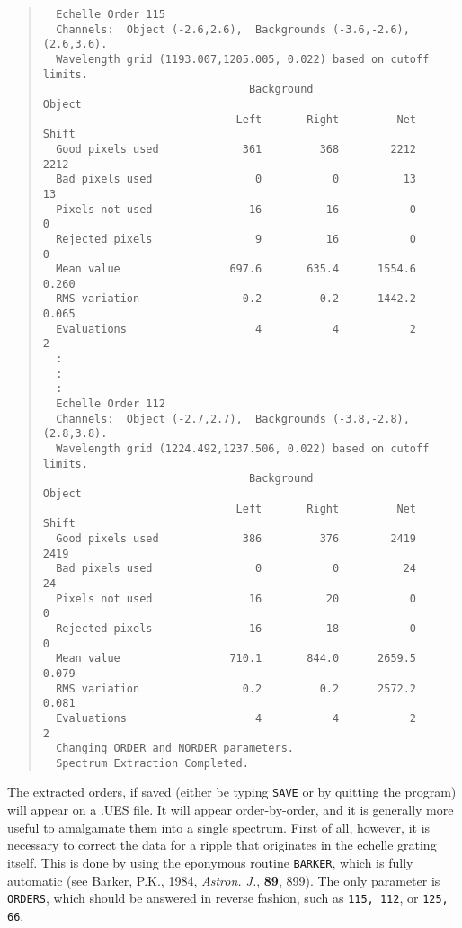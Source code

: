\begin{quote}
\begin{verbatim}
  Echelle Order 115
  Channels:  Object (-2.6,2.6),  Backgrounds (-3.6,-2.6),(2.6,3.6).
  Wavelength grid (1193.007,1205.005, 0.022) based on cutoff limits.
                                Background                  Object
                              Left       Right         Net       Shift
  Good pixels used             361         368        2212        2212
  Bad pixels used                0           0          13          13
  Pixels not used               16          16           0           0
  Rejected pixels                9          16           0           0
  Mean value                 697.6       635.4      1554.6       0.260
  RMS variation                0.2         0.2      1442.2       0.065
  Evaluations                    4           4           2           2
  :
  :
  :
  Echelle Order 112
  Channels:  Object (-2.7,2.7),  Backgrounds (-3.8,-2.8),(2.8,3.8).
  Wavelength grid (1224.492,1237.506, 0.022) based on cutoff limits.
                                Background                  Object
                              Left       Right         Net       Shift
  Good pixels used             386         376        2419        2419
  Bad pixels used                0           0          24          24
  Pixels not used               16          20           0           0
  Rejected pixels               16          18           0           0
  Mean value                 710.1       844.0      2659.5       0.079
  RMS variation                0.2         0.2      2572.2       0.081
  Evaluations                    4           4           2           2
  Changing ORDER and NORDER parameters.
  Spectrum Extraction Completed.
\end{verbatim}
\end{quote}
The extracted orders, if saved (either be typing {\tt SAVE} or by quitting
the program) will appear on a .UES file. It will appear order-by-order, and it 
is generally more useful to amalgamate them into a single spectrum. First of 
all, however, it is necessary to correct the data for a ripple that originates 
in the echelle grating itself. This is done by using the eponymous routine 
{\tt BARKER}, which is fully automatic (see Barker, P.K., 1984, {\it Astron. 
J.}, {\bf 89}, 899). The only parameter is {\tt ORDERS}, which should be 
answered in reverse fashion, such as {\tt 115, 112}, or {\tt 125, 66}. 

